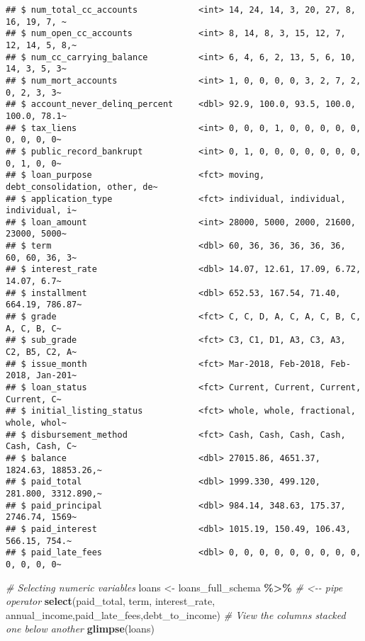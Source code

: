 \documentclass[
]{article}
\newenvironment{Shaded}{\begin{snugshade}}{\end{snugshade}}
\newcommand{\CommentTok}[1]{\textcolor[rgb]{0.56,0.35,0.01}{\textit{#1}}}
\newcommand{\FunctionTok}[1]{\textcolor[rgb]{0.13,0.29,0.53}{\textbf{#1}}}
\newcommand{\NormalTok}[1]{#1}
\newcommand{\OtherTok}[1]{\textcolor[rgb]{0.56,0.35,0.01}{#1}}
\newcommand{\SpecialCharTok}[1]{\textcolor[rgb]{0.81,0.36,0.00}{\textbf{#1}}}
\begin{document}
\begin{verbatim}
## $ num_total_cc_accounts            <int> 14, 24, 14, 3, 20, 27, 8, 16, 19, 7, ~
## $ num_open_cc_accounts             <int> 8, 14, 8, 3, 15, 12, 7, 12, 14, 5, 8,~
## $ num_cc_carrying_balance          <int> 6, 4, 6, 2, 13, 5, 6, 10, 14, 3, 5, 3~
## $ num_mort_accounts                <int> 1, 0, 0, 0, 0, 3, 2, 7, 2, 0, 2, 3, 3~
## $ account_never_delinq_percent     <dbl> 92.9, 100.0, 93.5, 100.0, 100.0, 78.1~
## $ tax_liens                        <int> 0, 0, 0, 1, 0, 0, 0, 0, 0, 0, 0, 0, 0~
## $ public_record_bankrupt           <int> 0, 1, 0, 0, 0, 0, 0, 0, 0, 0, 1, 0, 0~
## $ loan_purpose                     <fct> moving, debt_consolidation, other, de~
## $ application_type                 <fct> individual, individual, individual, i~
## $ loan_amount                      <int> 28000, 5000, 2000, 21600, 23000, 5000~
## $ term                             <dbl> 60, 36, 36, 36, 36, 36, 60, 60, 36, 3~
## $ interest_rate                    <dbl> 14.07, 12.61, 17.09, 6.72, 14.07, 6.7~
## $ installment                      <dbl> 652.53, 167.54, 71.40, 664.19, 786.87~
## $ grade                            <fct> C, C, D, A, C, A, C, B, C, A, C, B, C~
## $ sub_grade                        <fct> C3, C1, D1, A3, C3, A3, C2, B5, C2, A~
## $ issue_month                      <fct> Mar-2018, Feb-2018, Feb-2018, Jan-201~
## $ loan_status                      <fct> Current, Current, Current, Current, C~
## $ initial_listing_status           <fct> whole, whole, fractional, whole, whol~
## $ disbursement_method              <fct> Cash, Cash, Cash, Cash, Cash, Cash, C~
## $ balance                          <dbl> 27015.86, 4651.37, 1824.63, 18853.26,~
## $ paid_total                       <dbl> 1999.330, 499.120, 281.800, 3312.890,~
## $ paid_principal                   <dbl> 984.14, 348.63, 175.37, 2746.74, 1569~
## $ paid_interest                    <dbl> 1015.19, 150.49, 106.43, 566.15, 754.~
## $ paid_late_fees                   <dbl> 0, 0, 0, 0, 0, 0, 0, 0, 0, 0, 0, 0, 0~
\end{verbatim}

\begin{Shaded}
\begin{Highlighting}[]
\CommentTok{\# Selecting numeric variables}
\NormalTok{loans }\OtherTok{\textless{}{-}}\NormalTok{ loans\_full\_schema }\SpecialCharTok{\%\textgreater{}\%} \CommentTok{\# \textless{}{-}{-} pipe operator}
  \FunctionTok{select}\NormalTok{(paid\_total, term, interest\_rate,}
\NormalTok{         annual\_income,paid\_late\_fees,debt\_to\_income)}
\CommentTok{\# View the columns stacked one below another}
\FunctionTok{glimpse}\NormalTok{(loans)}
\end{Highlighting}
\end{Shaded}
\end{document}
